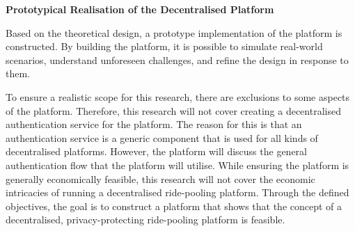\textbf{Prototypical Realisation of the Decentralised Platform}

Based on the theoretical design, a prototype implementation of the platform is constructed. By building the platform,  it is possible to simulate real-world scenarios, understand unforeseen challenges, and refine the design in response to them.

To ensure a realistic scope for this research, there are exclusions to some aspects of the platform. Therefore, this research will not cover creating a decentralised authentication service for the platform. The reason for this is that an authentication service is a generic component that is used for all kinds of decentralised platforms. However, the platform will discuss the general authentication flow that the platform will utilise. While ensuring the platform is generally economically feasible, this research will not cover the economic intricacies of running a decentralised ride-pooling platform.
Through the defined objectives, the goal is to construct a platform that shows that the concept of a decentralised, privacy-protecting ride-pooling platform is feasible.